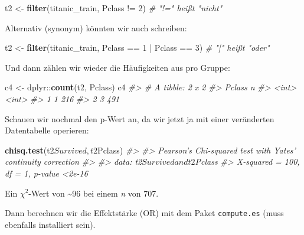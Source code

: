 \documentclass[12pt,ngerman,]{book}
\makeatletter
\newenvironment{Shaded}{\begin{snugshade}}{\end{snugshade}}
\newcommand{\KeywordTok}[1]{\textcolor[rgb]{0.13,0.29,0.53}{\textbf{{#1}}}}
\newcommand{\DecValTok}[1]{\textcolor[rgb]{0.00,0.00,0.81}{{#1}}}
\newcommand{\StringTok}[1]{\textcolor[rgb]{0.31,0.60,0.02}{{#1}}}
\newcommand{\CommentTok}[1]{\textcolor[rgb]{0.56,0.35,0.01}{\textit{{#1}}}}
\newcommand{\NormalTok}[1]{{#1}}
\newenvironment{kframe}{%
\medskip{}
\setlength{\fboxsep}{.8em}
 \def\at@end@of@kframe{}%
 \ifinner\ifhmode%
  \def\at@end@of@kframe{\end{minipage}}%
  \begin{minipage}{\columnwidth}%
 \fi\fi%
 \def\FrameCommand##1{\hskip\@totalleftmargin \hskip-\fboxsep
 \colorbox{shadecolor}{##1}\hskip-\fboxsep
     \hskip-\linewidth \hskip-\@totalleftmargin \hskip\columnwidth}%
 \MakeFramed {\advance\hsize-\width
   \@totalleftmargin\z@ \linewidth\hsize
   \@setminipage}}%
 {\par\unskip\endMakeFramed%
 \at@end@of@kframe}
\renewenvironment{Shaded}{\begin{kframe}}{\end{kframe}}
\makeatother
\begin{document}
\begin{Shaded}
\begin{Highlighting}[]
\NormalTok{t2 <-}\StringTok{ }\KeywordTok{filter}\NormalTok{(titanic_train, Pclass !=}\StringTok{ }\DecValTok{2}\NormalTok{)  }\CommentTok{# "!=" heißt "nicht"}
\end{Highlighting}
\end{Shaded}

Alternativ (synonym) könnten wir auch schreiben:

\begin{Shaded}
\begin{Highlighting}[]
\NormalTok{t2 <-}\StringTok{ }\KeywordTok{filter}\NormalTok{(titanic_train, Pclass ==}\StringTok{ }\DecValTok{1} \NormalTok{|}\StringTok{ }\NormalTok{Pclass ==}\StringTok{ }\DecValTok{3}\NormalTok{)  }\CommentTok{# "|" heißt "oder"}
\end{Highlighting}
\end{Shaded}

Und dann zählen wir wieder die Häufigkeiten aus pro Gruppe:

\begin{Shaded}
\begin{Highlighting}[]
\NormalTok{c4 <-}\StringTok{ }\NormalTok{dplyr::}\KeywordTok{count}\NormalTok{(t2, Pclass)}
\NormalTok{c4}
\CommentTok{#> # A tibble: 2 x 2}
\CommentTok{#>   Pclass     n}
\CommentTok{#>    <int> <int>}
\CommentTok{#> 1      1   216}
\CommentTok{#> 2      3   491}
\end{Highlighting}
\end{Shaded}

Schauen wir nochmal den p-Wert an, da wir jetzt ja mit einer veränderten
Datentabelle operieren:

\begin{Shaded}
\begin{Highlighting}[]
\KeywordTok{chisq.test}\NormalTok{(t2$Survived, t2$Pclass)}
\CommentTok{#> }
\CommentTok{#>  Pearson's Chi-squared test with Yates' continuity correction}
\CommentTok{#> }
\CommentTok{#> data:  t2$Survived and t2$Pclass}
\CommentTok{#> X-squared = 100, df = 1, p-value <2e-16}
\end{Highlighting}
\end{Shaded}

Ein \(\chi^2\)-Wert von \textasciitilde{}96 bei einem \emph{n} von 707.

Dann berechnen wir die Effektstärke (OR) mit dem Paket
\texttt{compute.es} (muss ebenfalls installiert sein).
\end{document}
